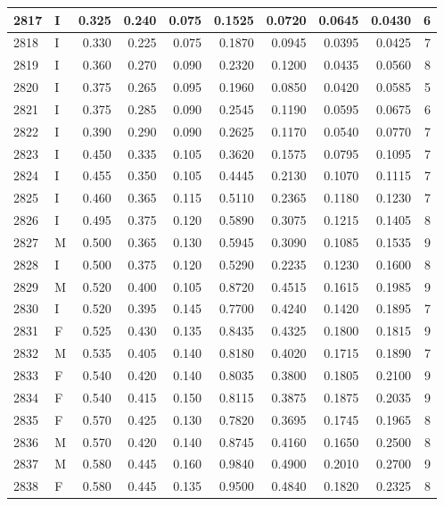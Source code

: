 \documentclass[9pt,twocolumn,twoside,]{pnas-new}
\begin{document}
\begin{tabular}{l|l|r|r|r|r|r|r|r|r}
\hline
2817 & I & 0.325 & 0.240 & 0.075 & 0.1525 & 0.0720 & 0.0645 & 0.0430 & 6\\
\hline
2818 & I & 0.330 & 0.225 & 0.075 & 0.1870 & 0.0945 & 0.0395 & 0.0425 & 7\\
\hline
2819 & I & 0.360 & 0.270 & 0.090 & 0.2320 & 0.1200 & 0.0435 & 0.0560 & 8\\
\hline
2820 & I & 0.375 & 0.265 & 0.095 & 0.1960 & 0.0850 & 0.0420 & 0.0585 & 5\\
\hline
2821 & I & 0.375 & 0.285 & 0.090 & 0.2545 & 0.1190 & 0.0595 & 0.0675 & 6\\
\hline
2822 & I & 0.390 & 0.290 & 0.090 & 0.2625 & 0.1170 & 0.0540 & 0.0770 & 7\\
\hline
2823 & I & 0.450 & 0.335 & 0.105 & 0.3620 & 0.1575 & 0.0795 & 0.1095 & 7\\
\hline
2824 & I & 0.455 & 0.350 & 0.105 & 0.4445 & 0.2130 & 0.1070 & 0.1115 & 7\\
\hline
2825 & I & 0.460 & 0.365 & 0.115 & 0.5110 & 0.2365 & 0.1180 & 0.1230 & 7\\
\hline
2826 & I & 0.495 & 0.375 & 0.120 & 0.5890 & 0.3075 & 0.1215 & 0.1405 & 8\\
\hline
2827 & M & 0.500 & 0.365 & 0.130 & 0.5945 & 0.3090 & 0.1085 & 0.1535 & 9\\
\hline
2828 & I & 0.500 & 0.375 & 0.120 & 0.5290 & 0.2235 & 0.1230 & 0.1600 & 8\\
\hline
2829 & M & 0.520 & 0.400 & 0.105 & 0.8720 & 0.4515 & 0.1615 & 0.1985 & 9\\
\hline
2830 & I & 0.520 & 0.395 & 0.145 & 0.7700 & 0.4240 & 0.1420 & 0.1895 & 7\\
\hline
2831 & F & 0.525 & 0.430 & 0.135 & 0.8435 & 0.4325 & 0.1800 & 0.1815 & 9\\
\hline
2832 & M & 0.535 & 0.405 & 0.140 & 0.8180 & 0.4020 & 0.1715 & 0.1890 & 7\\
\hline
2833 & F & 0.540 & 0.420 & 0.140 & 0.8035 & 0.3800 & 0.1805 & 0.2100 & 9\\
\hline
2834 & F & 0.540 & 0.415 & 0.150 & 0.8115 & 0.3875 & 0.1875 & 0.2035 & 9\\
\hline
2835 & F & 0.570 & 0.425 & 0.130 & 0.7820 & 0.3695 & 0.1745 & 0.1965 & 8\\
\hline
2836 & M & 0.570 & 0.420 & 0.140 & 0.8745 & 0.4160 & 0.1650 & 0.2500 & 8\\
\hline
2837 & M & 0.580 & 0.445 & 0.160 & 0.9840 & 0.4900 & 0.2010 & 0.2700 & 9\\
\hline
2838 & F & 0.580 & 0.445 & 0.135 & 0.9500 & 0.4840 & 0.1820 & 0.2325 & 8\\

\end{tabular}
\end{document}
